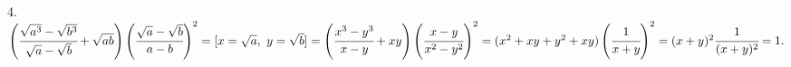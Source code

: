 4. $\left(\cfrac{\sqrt{a^3}-\sqrt{b^3}}{\sqrt{a}-\sqrt{b}}+\sqrt{ab}\right)\left(\cfrac{\sqrt{a}-\sqrt{b}}{a-b}\right)^2=[x=\sqrt{a},\ y=\sqrt{b}]=
\left(\cfrac{x^3-y^3}{x-y}+xy\right)\left(\cfrac{x-y}{x^2-y^2}\right)^2=(x^2+xy+y^2+xy)\left(\cfrac{1}{x+y}\right)^2=
(x+y)^2\cfrac{1}{(x+y)^2}=1.$\\
